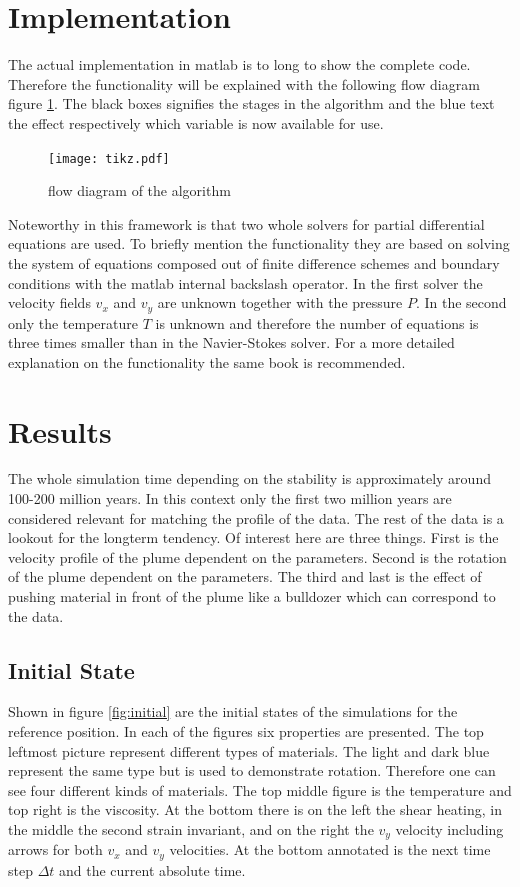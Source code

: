 \documentclass[12pt]{scrartcl}
\begin{document}
\section{Implementation}
\label{seq:impl}
The actual implementation in matlab is to long to show the complete code. Therefore the functionality will be explained with the following flow diagram figure \ref{fig:flow}. The black boxes signifies the stages in the algorithm and the blue text the effect respectively which variable is now available for use.

\begin{figure}[!ht]
\texttt{[image: tikz.pdf]}
\caption{flow diagram of the algorithm}
\label{fig:flow}
\end{figure}

Noteworthy in this framework is that two whole solvers for partial differential equations are used. To briefly mention the functionality they are based on solving the system of equations composed out of finite difference schemes and boundary conditions with the matlab internal backslash operator. In the first solver the velocity fields $v_x$ and $v_y$ are unknown together with the pressure $P$. In the second only the temperature $T$ is unknown and therefore the number of equations is three times smaller than in the Navier-Stokes solver. For a more detailed explanation on the functionality the same book \cite{gerya2009introduction} is recommended.

\section{Results}
The whole simulation time depending on the stability is approximately around 100-200 million years. In this context only the first two million years are considered relevant for matching the profile of the data. The rest of the data is a lookout for the longterm tendency. Of interest here are three things. First is the velocity profile of the plume dependent on the parameters. Second is the rotation of the plume dependent on the parameters. The third and last is the effect of pushing material in front of the plume like a bulldozer which can correspond to the data.
\subsection{Initial State}
Shown in figure \ref{fig:initial} are the initial states of the simulations for the reference position. In each of the figures six properties are presented. The top leftmost picture represent different types of materials. The light and dark blue represent the same type but is used to demonstrate rotation. Therefore one can see four different kinds of materials. The top middle figure is the temperature and top right is the viscosity. At the bottom there is on the left the shear heating, in the middle the second strain invariant, and on the right the $v_y$ velocity including arrows for both $v_x$ and $v_y$ velocities. At the bottom annotated is the next time step $\Delta t$ and the current absolute time.
\end{document}
